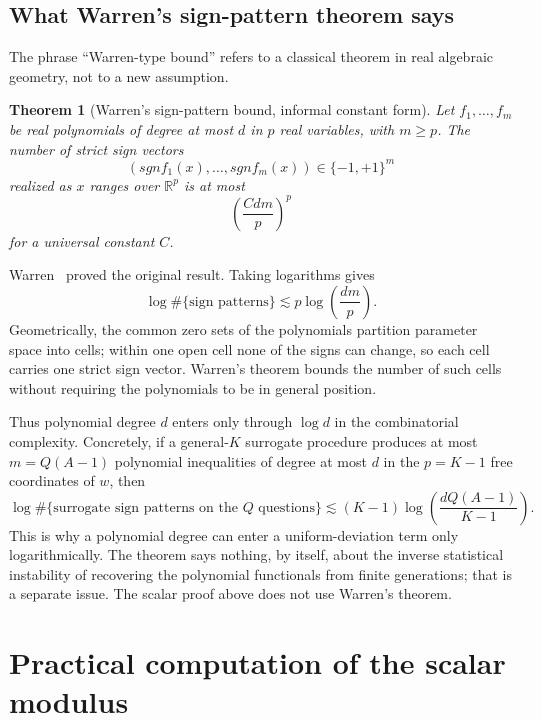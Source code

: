 \documentclass[11pt]{article}
\def\sgn{sgn}%
\newtheorem{theorem}{Theorem}[section]
\newcommand{\R}{\mathbb R}
\newcommand{\sgn}{\operatorname{sgn}}
\begin{document}
\subsection{What Warren's sign-pattern theorem says}

The phrase ``Warren-type bound'' refers to a classical theorem in real algebraic geometry, not to a new assumption.

\begin{theorem}[Warren's sign-pattern bound, informal constant form]
\label{thm:warren}
Let $f_1,\dots,f_m$ be real polynomials of degree at most $d$ in $p$ real variables, with $m\ge p$.  The number of strict sign vectors
\[
(\sgn f_1(x),\dots,\sgn f_m(x))\in\{-1,+1\}^m
\]
realized as $x$ ranges over $\R^p$ is at most
\[
\left(\frac{Cdm}{p}\right)^p
\]
for a universal constant $C$.
\end{theorem}

Warren~\cite{Warren} proved the original result.  Taking logarithms gives
\[
\log \#\{\text{sign patterns}\}
\lesssim
p\log\left(\frac{dm}{p}\right).
\]
Geometrically, the common zero sets of the polynomials partition parameter space into cells; within one open cell none of the signs can change, so each cell carries one strict sign vector.  Warren's theorem bounds the number of such cells without requiring the polynomials to be in general position.

Thus polynomial degree $d$ enters only through $\log d$ in the combinatorial complexity.  Concretely, if a general-$K$ surrogate procedure produces at most $m=Q(A-1)$ polynomial inequalities of degree at most $d$ in the $p=K-1$ free coordinates of $w$, then
\[
\log \#\{\text{surrogate sign patterns on the }Q\text{ questions}\}
\lesssim
(K-1)\log\!\left(\frac{dQ(A-1)}{K-1}\right).
\]
This is why a polynomial degree can enter a uniform-deviation term only logarithmically.  The theorem says nothing, by itself, about the inverse statistical instability of recovering the polynomial functionals from finite generations; that is a separate issue.  The scalar proof above does not use Warren's theorem.

\section{Practical computation of the scalar modulus}
\end{document}
